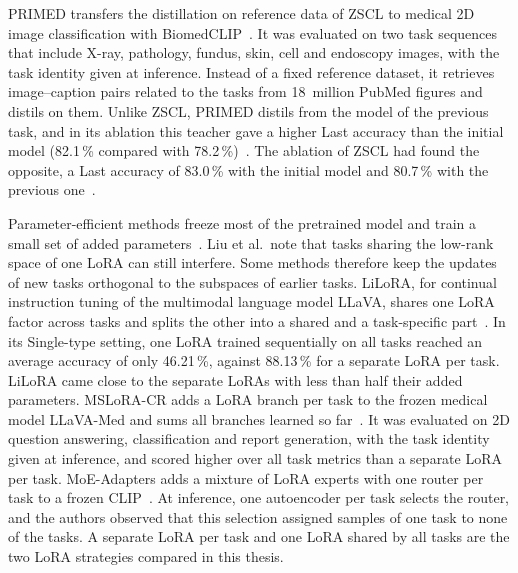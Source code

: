 PRIMED transfers the distillation on reference data of ZSCL to medical 2D image classification with BiomedCLIP~\cite{chen2025forgingdynamicmemoryretrievalguided}.
It was evaluated on two task sequences that include X-ray, pathology, fundus, skin, cell and endoscopy images, with the task identity given at inference.
Instead of a fixed reference dataset, it retrieves image--caption pairs related to the tasks from 18~million PubMed figures and distils on them.
Unlike ZSCL, PRIMED distils from the model of the previous task, and in its ablation this teacher gave a higher Last accuracy than the initial model (82.1\,\% compared with 78.2\,\%)~\cite[Table~4a]{chen2025forgingdynamicmemoryretrievalguided}.
The ablation of ZSCL had found the opposite, a Last accuracy of 83.0\,\% with the initial model and 80.7\,\% with the previous one~\cite[Table~1d]{zheng2023preventingzeroshottransferdegradation}.

Parameter-efficient methods freeze most of the pretrained model and train a small set of added parameters~\cite[Sec.~4.3]{liu2026continuallearningvlmssurvey}.
Liu et al.\ note that tasks sharing the low-rank space of one LoRA can still interfere.
Some methods therefore keep the updates of new tasks orthogonal to the subspaces of earlier tasks.
LiLoRA, for continual instruction tuning of the multimodal language model LLaVA, shares one LoRA factor across tasks and splits the other into a shared and a task-specific part~\cite{che2026loraloraparameterefficientarchitecture}.
In its Single-type setting, one LoRA trained sequentially on all tasks reached an average accuracy of only 46.21\,\%, against 88.13\,\% for a separate LoRA per task.
LiLoRA came close to the separate LoRAs with less than half their added parameters.
MSLoRA-CR adds a LoRA branch per task to the frozen medical model LLaVA-Med and sums all branches learned so far~\cite{Zhang_2025}.
It was evaluated on 2D question answering, classification and report generation, with the task identity given at inference, and scored higher over all task metrics than a separate LoRA per task.
MoE-Adapters adds a mixture of LoRA experts with one router per task to a frozen CLIP~\cite{yu2024boostingcontinuallearningvisionlanguage}.
At inference, one autoencoder per task selects the router, and the authors observed that this selection assigned samples of one task to none of the tasks.
A separate LoRA per task and one LoRA shared by all tasks are the two LoRA strategies compared in this thesis.

